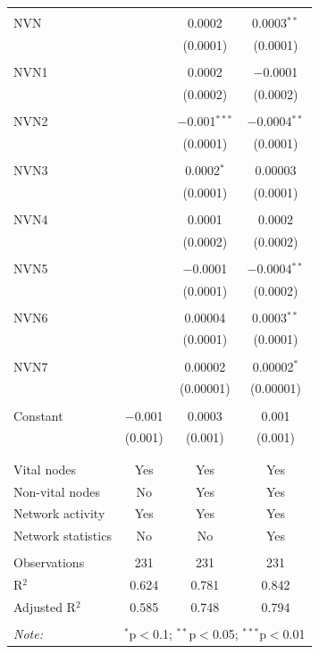 \begin{table}[!htbp]
\begin{tabular}{@{\extracolsep{5pt}}lccc}
  & & & \\ 
 NVN &  & 0.0002 & 0.0003$^{**}$ \\ 
  &  & (0.0001) & (0.0001) \\ 
  & & & \\ 
 NVN1 &  & 0.0002 & $-$0.0001 \\ 
  &  & (0.0002) & (0.0002) \\ 
  & & & \\ 
 NVN2 &  & $-$0.001$^{***}$ & $-$0.0004$^{**}$ \\ 
  &  & (0.0001) & (0.0001) \\ 
  & & & \\ 
 NVN3 &  & 0.0002$^{*}$ & 0.00003 \\ 
  &  & (0.0001) & (0.0001) \\ 
  & & & \\ 
 NVN4 &  & 0.0001 & 0.0002 \\ 
  &  & (0.0002) & (0.0002) \\ 
  & & & \\ 
 NVN5 &  & $-$0.0001 & $-$0.0004$^{**}$ \\ 
  &  & (0.0001) & (0.0002) \\ 
  & & & \\ 
 NVN6 &  & 0.00004 & 0.0003$^{**}$ \\ 
  &  & (0.0001) & (0.0001) \\ 
  & & & \\ 
 NVN7 &  & 0.00002 & 0.00002$^{*}$ \\ 
  &  & (0.00001) & (0.00001) \\ 
  & & & \\ 
 Constant & $-$0.001 & 0.0003 & 0.001 \\ 
  & (0.001) & (0.001) & (0.001) \\ 
  & & & \\ 
\hline \\[-1.8ex] 
Vital nodes & Yes & Yes & Yes \\ 
Non-vital nodes & No & Yes & Yes \\ 
Network activity & Yes & Yes & Yes \\ 
Network statistics & No & No & Yes \\ 
\hline &  &  &  \\ 
Observations & 231 & 231 & 231 \\ 
R$^{2}$ & 0.624 & 0.781 & 0.842 \\ 
Adjusted R$^{2}$ & 0.585 & 0.748 & 0.794 \\ 
\hline 
\hline \\[-1.8ex] 
\textit{Note:}  & \multicolumn{3}{r}{$^{*}$p$<$0.1; $^{**}$p$<$0.05; $^{***}$p$<$0.01} \\ 
\end{tabular} 
\end{table} 
